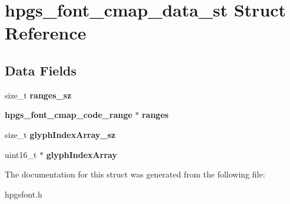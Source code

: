 \section{hpgs\_\-font\_\-cmap\_\-data\_\-st Struct Reference}
\label{structhpgs__font__cmap__data__st}
\subsection*{Data Fields}
\begin{DoxyCompactItemize}
\item 
size\_\-t {\bfseries ranges\_\-sz}\label{structhpgs__font__cmap__data__st_a0efd8d6f4bdb0d6e885fa844dedf01c2}

\item 
{\bf hpgs\_\-font\_\-cmap\_\-code\_\-range} $\ast$ {\bfseries ranges}\label{structhpgs__font__cmap__data__st_a7ada702f7859f1ea0988b3708e1827bd}

\item 
size\_\-t {\bfseries glyphIndexArray\_\-sz}\label{structhpgs__font__cmap__data__st_a94e280c0652411e3e8b9cb5badc6cd5e}

\item 
uint16\_\-t $\ast$ {\bfseries glyphIndexArray}\label{structhpgs__font__cmap__data__st_a7b1a79c4164a0bb9650c4ba54f858e47}

\end{DoxyCompactItemize}


The documentation for this struct was generated from the following file:\begin{DoxyCompactItemize}
\item 
hpgsfont.h\end{DoxyCompactItemize}

